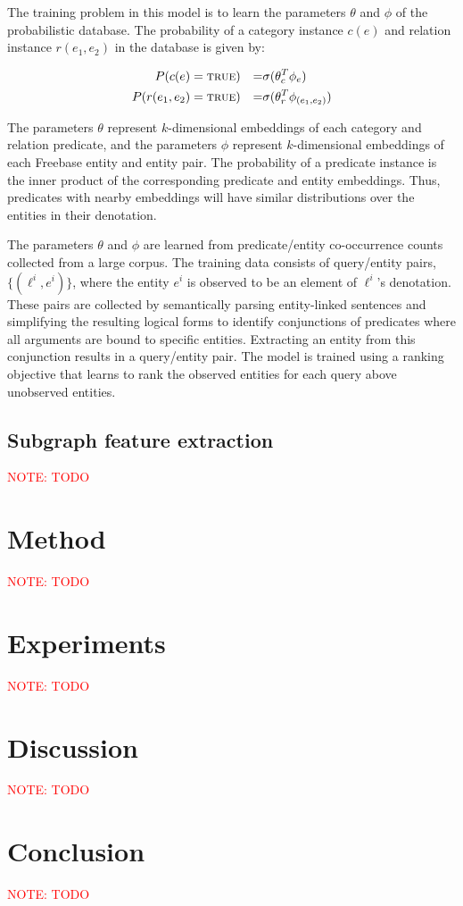 \documentclass[11pt]{article}
\newcommand{\mattnote}[1]{\textcolor{red}{NOTE: #1}}
\newcommand{\predicate}[1]{\ensuremath{\textsc{#1}}}
\newcommand{\true}[0]{\predicate{true}}
\begin{document}
The training problem in this model is to learn the parameters $\theta$
and $\phi$ of the probabilistic database. The probability of a
category instance $c(e)$ and relation instance $r(e_1, e_2)$ in the
database is given by:

\begin{align*}
  P(c(e) & = \true{}) & = & \sigma ( \theta_c^T \phi_e ) \\
  P(r(e_1, e_2) & = \true{}) & = & \sigma ( \theta_r^T \phi_{(e_1, e_2)} )
\end{align*}

The parameters $\theta$ represent $k$-dimensional embeddings of each
category and relation predicate, and the parameters $\phi$ represent
$k$-dimensional embeddings of each Freebase entity and entity
pair. The probability of a predicate instance is the inner product of
the corresponding predicate and entity embeddings. Thus, predicates
with nearby embeddings will have similar distributions over the
entities in their denotation.

The parameters $\theta$ and $\phi$ are learned from predicate/entity
co-occurrence counts collected from a large corpus. The training data
consists of query/entity pairs, $\{(\ell^i, e^i)\}$, where the entity
$e^i$ is observed to be an element of $\ell^i$'s denotation. These
pairs are collected by semantically parsing entity-linked sentences
and simplifying the resulting logical forms to identify conjunctions
of predicates where all arguments are bound to specific
entities. Extracting an entity from this conjunction results in a
query/entity pair. The model is trained using a ranking objective that
learns to rank the observed entities for each query above unobserved
entities.

\subsection{Subgraph feature extraction}

\mattnote{TODO}

\section{Method}
\label{sec:method}

\mattnote{TODO}

\section{Experiments}
\label{sec:experiments}

\mattnote{TODO}

\section{Discussion}
\label{sec:discussion}

\mattnote{TODO}

\section{Conclusion}
\label{sec:conclusion}

\mattnote{TODO}




\end{document}

